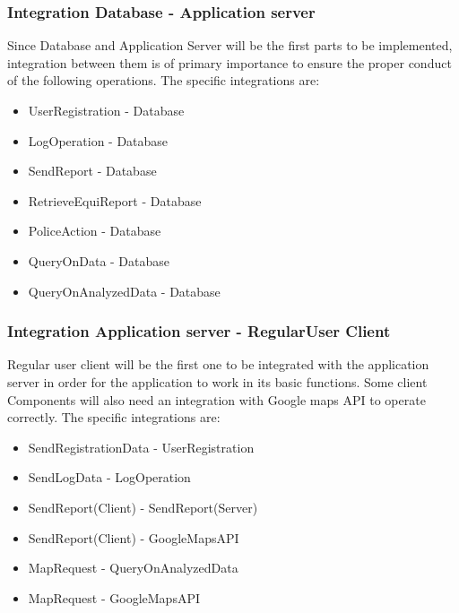 \subsubsection{Integration Database - Application server}
Since Database and Application Server will be the first parts to be implemented, integration between them is of primary importance to ensure the proper conduct of the following operations.
The specific integrations are:
\begin{itemize}
	\item UserRegistration - Database
	\item LogOperation - Database
	\item SendReport - Database
	\item RetrieveEquiReport - Database
	\item PoliceAction - Database
	\item QueryOnData - Database
	\item QueryOnAnalyzedData - Database
\end{itemize}

\subsubsection{Integration Application server - RegularUser Client}
Regular user client will be the first one to be integrated with the application server in order for the application to work in its basic functions.
Some client Components will also need an integration with Google maps API to operate correctly.
The specific integrations are:
\begin{itemize}
	\item SendRegistrationData - UserRegistration
	\item SendLogData - LogOperation
	\item SendReport(Client) - SendReport(Server)
	\item SendReport(Client) - GoogleMapsAPI
	\item MapRequest - QueryOnAnalyzedData
	\item MapRequest - GoogleMapsAPI
\end{itemize}


